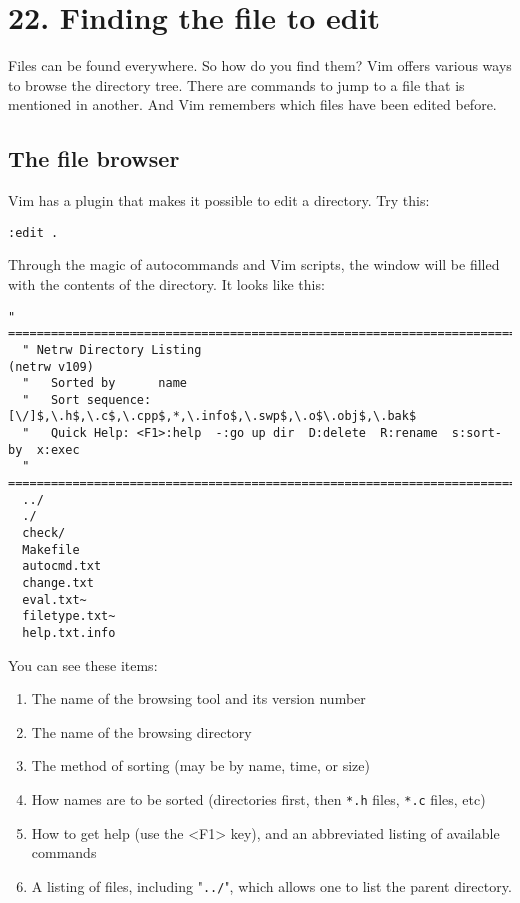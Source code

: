 \section{22. Finding the file to edit}
Files can be found everywhere.  So how do you find them?  Vim offers various
ways to browse the directory tree.  There are commands to jump to a file that
is mentioned in another.  And Vim remembers which files have been edited
before.
\subsection{The file browser}

Vim has a plugin that makes it possible to edit a directory.  Try this:

\begin{Verbatim}[samepage=true]
 :edit .
\end{Verbatim}

Through the magic of autocommands and Vim scripts, the window will be filled with the contents of the directory.
It looks like this:

\begin{Verbatim}[samepage=true]
  " ============================================================================ 
  " Netrw Directory Listing                                        (netrw v109) 
  "   Sorted by      name 
  "   Sort sequence: [\/]$,\.h$,\.c$,\.cpp$,*,\.info$,\.swp$,\.o$\.obj$,\.bak$ 
  "   Quick Help: <F1>:help  -:go up dir  D:delete  R:rename  s:sort-by  x:exec 
  " ============================================================================ 
  ../ 
  ./ 
  check/ 
  Makefile 
  autocmd.txt 
  change.txt 
  eval.txt~ 
  filetype.txt~ 
  help.txt.info 
\end{Verbatim}

You can see these items:

\begin{enumerate}
\item The name of the browsing tool and its version number
\item The name of the browsing directory
\item The method of sorting (may be by name, time, or size)
\item How names are to be sorted (directories first, then \verb!*.h! files, \verb!*.c! files, etc)
\item How to get help (use the <F1> key), and an abbreviated listing of available commands
\item A listing of files, including "\verb!../!", which allows one to list the parent directory.
\end{enumerate}

